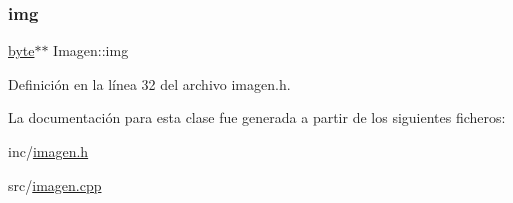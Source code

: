 \subsubsection{\texorpdfstring{img}{img}}
{\footnotesize\ttfamily \hyperlink{imagen_8h_a0c8186d9b9b7880309c27230bbb5e69d}{byte}$\ast$$\ast$ Imagen\+::img\hspace{0.3cm}{\ttfamily [private]}}



Definición en la línea 32 del archivo imagen.\+h.



La documentación para esta clase fue generada a partir de los siguientes ficheros\+:\begin{DoxyCompactItemize}
\item 
inc/\hyperlink{imagen_8h}{imagen.\+h}\item 
src/\hyperlink{imagen_8cpp}{imagen.\+cpp}\end{DoxyCompactItemize}
